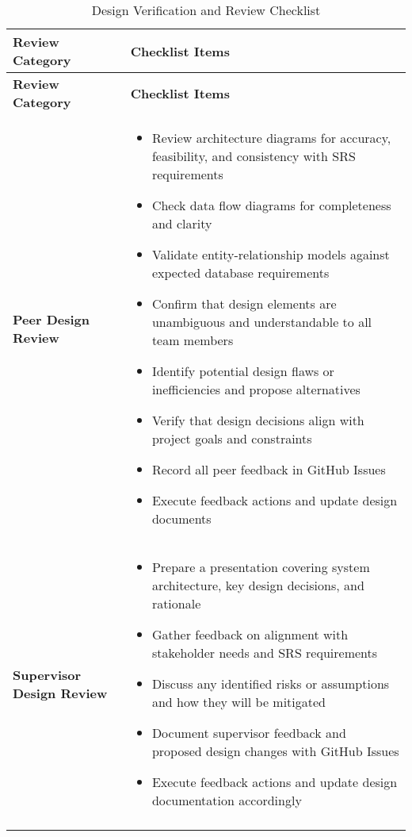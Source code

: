 \documentclass[12pt, titlepage]{article}
\begin{document}
\begin{longtable}{|p{4cm}|p{11cm}|}
\hline
\textbf{Review Category} & \textbf{Checklist Items} \\
\hline
\endfirsthead

\hline
\textbf{Review Category} & \textbf{Checklist Items} \\
\hline
\endhead

\textbf{Peer Design Review} &
\begin{itemize}
  \item Review architecture diagrams for accuracy, feasibility, and consistency with SRS requirements
  \item Check data flow diagrams for completeness and clarity
  \item Validate entity-relationship models against expected database requirements
  \item Confirm that design elements are unambiguous and understandable to all team members
  \item Identify potential design flaws or inefficiencies and propose alternatives
  \item Verify that design decisions align with project goals and constraints
  \item Record all peer feedback in GitHub Issues
  \item Execute feedback actions and update design documents
\end{itemize}
\\
\hline

\textbf{Supervisor Design Review} &
\begin{itemize}
  \item Prepare a presentation covering system architecture, key design decisions, and rationale
  \item Gather feedback on alignment with stakeholder needs and SRS requirements
  \item Discuss any identified risks or assumptions and how they will be mitigated
  \item Document supervisor feedback and proposed design changes with GitHub Issues
  \item Execute feedback actions and update design documentation accordingly
\end{itemize}
\\
\hline

\caption{Design Verification and Review Checklist}
\label{tab:design_verification_checklist}
\end{longtable}
\end{document}
